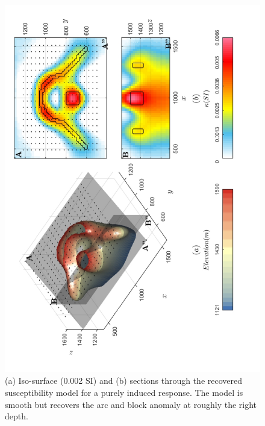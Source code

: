 \newpage
\begin{figure}[h!]
\centering
\includegraphics[scale=0.52, angle =270]{3D_Inv_l2l2_model_INDUCED.pdf}
\caption{(a) Iso-surface (0.002 SI) and (b) sections through the recovered susceptibility model for a purely induced response. The model is smooth but recovers the arc and block anomaly at roughly the right depth.}
\label{fig:3D_Inv_l2l2_model_INDUCED}
\end{figure}
